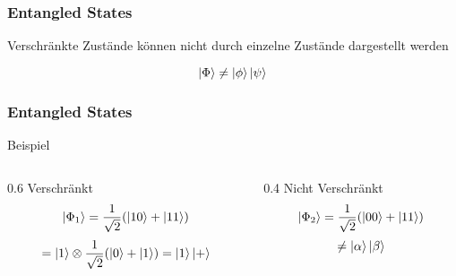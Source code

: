 \begin{frame}
    \frametitle{Entangled States}
    
    Verschränkte Zustände können nicht durch einzelne Zustände dargestellt werden

    \hfil

    $$\ket{\Phi} \neq \ket{\phi} \ket{\psi}$$

\end{frame}

\begin{frame}
    \frametitle{Entangled States}
    

    Beispiel

    \hfil

    \begin{columns}[c]
        \begin{column}{0.6\hsize}\centering
        Verschränkt
        $$\ket{\Phi_1} = \frac{1}{\sqrt{2}} ( \ket{10} + \ket{11})$$
        $$= \ket{1}\otimes \frac{1}{\sqrt{2}} ( \ket{0} + \ket{1})= \ket{1} \ket{+}$$
        \end{column}

        \begin{column}{0.4\hsize}
        Nicht Verschränkt
        $$\ket{\Phi_2} = \frac{1}{\sqrt{2}} ( \ket{00} + \ket{11})$$
        $$\neq \ket{\alpha}\ket{\beta}$$

        \end{column}
    \end{columns}

\end{frame}